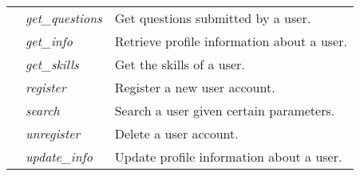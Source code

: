 \begin{table}
\begin{center}
\begin{tabular}{p{70px} | p{70px} | p{210px}}
															& \emph{get\_questions}		& Get questions submitted by a user. \\
															& \emph{get\_info}				&	Retrieve profile information about a user.	\\
															& \emph{get\_skills}			& Get the skills of a user. \\
															& \emph{register}					&	Register a new user account. \\
															& \emph{search}						&	Search a user given certain parameters. \\
															& \emph{unregister}				&	Delete a user account. \\
															& \emph{update\_info}			& Update profile information about a user. \\
				\hline
				\hline
		\end{tabular}
	\end{center}
	
\end{table}

